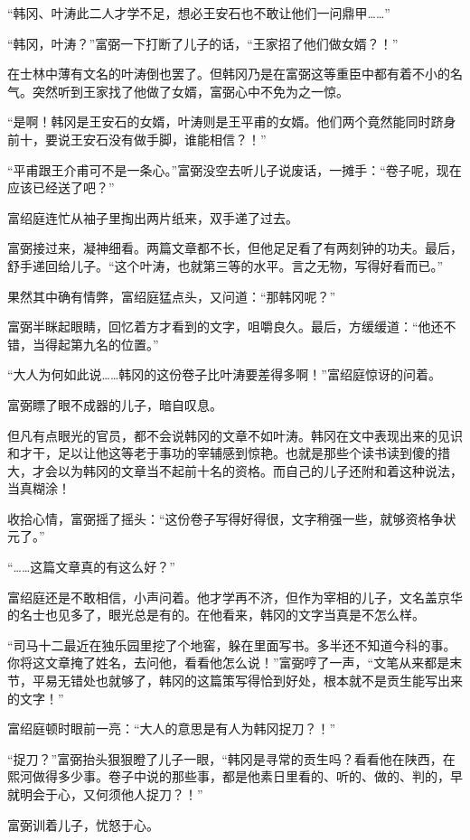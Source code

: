 “韩冈、叶涛此二人才学不足，想必王安石也不敢让他们一问鼎甲……”

“韩冈，叶涛？”富弼一下打断了儿子的话，“王家招了他们做女婿？！”

在士林中薄有文名的叶涛倒也罢了。但韩冈乃是在富弼这等重臣中都有着不小的名气。突然听到王家找了他做了女婿，富弼心中不免为之一惊。

“是啊！韩冈是王安石的女婿，叶涛则是王平甫的女婿。他们两个竟然能同时跻身前十，要说王安石没有做手脚，谁能相信？！”

“平甫跟王介甫可不是一条心。”富弼没空去听儿子说废话，一摊手：“卷子呢，现在应该已经送了吧？”

富绍庭连忙从袖子里掏出两片纸来，双手递了过去。

富弼接过来，凝神细看。两篇文章都不长，但他足足看了有两刻钟的功夫。最后，舒手递回给儿子。“这个叶涛，也就第三等的水平。言之无物，写得好看而已。”

果然其中确有情弊，富绍庭猛点头，又问道：“那韩冈呢？”

富弼半眯起眼睛，回忆着方才看到的文字，咀嚼良久。最后，方缓缓道：“他还不错，当得起第九名的位置。”

“大人为何如此说……韩冈的这份卷子比叶涛要差得多啊！”富绍庭惊讶的问着。

富弼瞟了眼不成器的儿子，暗自叹息。

但凡有点眼光的官员，都不会说韩冈的文章不如叶涛。韩冈在文中表现出来的见识和才干，足以让他这等老于事功的宰辅感到惊艳。也就是那些个读书读到傻的措大，才会以为韩冈的文章当不起前十名的资格。而自己的儿子还附和着这种说法，当真糊涂！

收拾心情，富弼摇了摇头：“这份卷子写得好得很，文字稍强一些，就够资格争状元了。”

“……这篇文章真的有这么好？”

富绍庭还是不敢相信，小声问着。他才学再不济，但作为宰相的儿子，文名盖京华的名士也见多了，眼光总是有的。在他看来，韩冈的文字当真是不怎么样。

“司马十二最近在独乐园里挖了个地窖，躲在里面写书。多半还不知道今科的事。你将这文章掩了姓名，去问他，看看他怎么说！”富弼哼了一声，“文笔从来都是末节，平易无错处也就够了，韩冈的这篇策写得恰到好处，根本就不是贡生能写出来的文字！”

富绍庭顿时眼前一亮：“大人的意思是有人为韩冈捉刀？！”

“捉刀？”富弼抬头狠狠瞪了儿子一眼，“韩冈是寻常的贡生吗？看看他在陕西，在熙河做得多少事。卷子中说的那些事，都是他素日里看的、听的、做的、判的，早就明会于心，又何须他人捉刀？！”

富弼训着儿子，忧怒于心。


